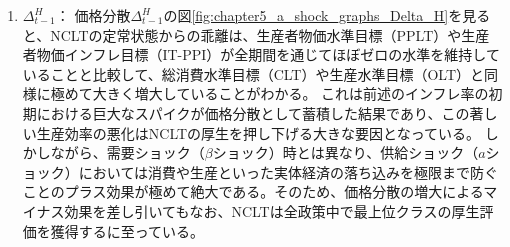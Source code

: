 \begin{enumerate}
    \item
    \label{itm:chapter5_a_shock_policies_nclt_Delta_t_minus_1_H}
        \(\Delta_{t-1}^H\)：
        価格分散\(\Delta_{t-1}^H\)の図\ref{fig:chapter5_a_shock_graphs_Delta_H}を見ると、NCLTの定常状態からの乖離は、生産者物価水準目標（PPLT）や生産者物価インフレ目標（IT-PPI）が全期間を通じてほぼゼロの水準を維持していることと比較して、総消費水準目標（CLT）や生産水準目標（OLT）と同様に極めて大きく増大していることがわかる。
        これは前述のインフレ率の初期における巨大なスパイクが価格分散として蓄積した結果であり、この著しい生産効率の悪化はNCLTの厚生を押し下げる大きな要因となっている。
        しかしながら、需要ショック（\(\beta\)ショック）時とは異なり、供給ショック（\(a\)ショック）においては消費や生産といった実体経済の落ち込みを極限まで防ぐことのプラス効果が極めて絶大である。そのため、価格分散の増大によるマイナス効果を差し引いてもなお、NCLTは全政策中で最上位クラスの厚生評価を獲得するに至っている。
\end{enumerate}